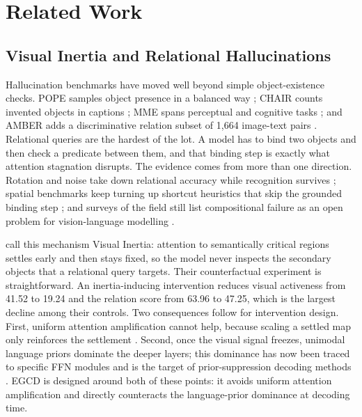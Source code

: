 \documentclass[pdflatex,sn-basic,Numbered]{sn-jnl}
\theoremstyle{thmstyleone}
\theoremstyle{thmstyletwo}
\theoremstyle{thmstylethree}
\begin{document}
\section{Related Work}\label{sec:related}

\subsection{Visual Inertia and Relational Hallucinations}\label{subsec:visual-inertia}

Hallucination benchmarks have moved well beyond simple object-existence checks. POPE samples object presence in a balanced way \cite{li2023bevaluating}; CHAIR counts invented objects in captions \cite{rohrbach2018object}; MME spans perceptual and cognitive tasks \cite{fu2025mme}; and AMBER adds a discriminative relation subset of 1,664 image-text pairs \cite{wang2023amber}. Relational queries are the hardest of the lot. A model has to bind two objects and then check a predicate between them, and that binding step is exactly what attention stagnation disrupts. The evidence comes from more than one direction. Rotation and noise take down relational accuracy while recognition survives \cite{shin2026when}; spatial benchmarks keep turning up shortcut heuristics that skip the grounded binding step \cite{brown2025hallucination}; and surveys of the field still list compositional failure as an open problem for vision-language modelling \cite{bordes2024introvlm}.

\cite{gong2026attention} call this mechanism Visual Inertia: attention to semantically critical regions settles early and then stays fixed, so the model never inspects the secondary objects that a relational query targets. Their counterfactual experiment is straightforward. An inertia-inducing intervention reduces visual activeness from 41.52 to 19.24 and the relation score from 63.96 to 47.25, which is the largest decline among their controls. Two consequences follow for intervention design. First, uniform attention amplification cannot help, because scaling a settled map only reinforces the settlement \cite{gong2026attention,chen2026mitigating}. Second, once the visual signal freezes, unimodal language priors dominate the deeper layers; this dominance has now been traced to specific FFN modules \cite{guo2026fade} and is the target of prior-suppression decoding methods \cite{ren2026nolan,min2025mitigating}. EGCD is designed around both of these points: it avoids uniform attention amplification and directly counteracts the language-prior dominance at decoding time.
\end{document}
